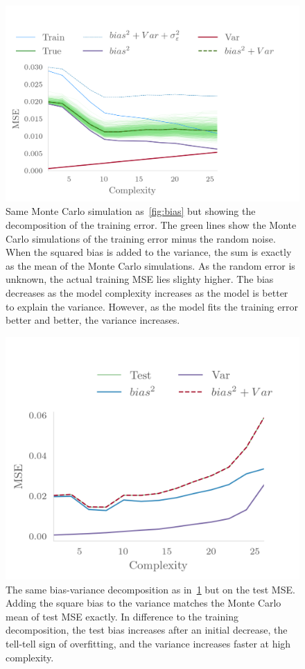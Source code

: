 \begin{figure}[]
  \centering
  \includegraphics[]{figures/trainbiasvariance.png}
  \caption{\label{fig:biastrain} Same Monte Carlo simulation as~\cref{fig:bias}
  but showing the decomposition of the training error. The green lines show the
  Monte Carlo simulations of the training error minus the random noise. When the
squared bias is added to the variance, the sum is exactly as the mean of the
Monte Carlo simulations. As the random error is unknown, the actual training MSE
lies slighty higher. The bias decreases as the model complexity increases as the
model is better to explain the variance. However, as the model fits the training
error better and better, the variance increases.}
\end{figure}


\begin{figure}[]
  \centering
  \includegraphics[]{figures/testbiasvariance.png}
  \caption{\label{fig:biastest} The same bias-variance decomposition as
    in~\cref{fig:biastrain} but on the test MSE. Adding the square bias to the
    variance matches the Monte Carlo mean of test MSE exactly. In difference to
    the training decomposition, the test bias increases after an initial
    decrease, the tell-tell sign of overfitting, and the variance increases
    faster at high complexity.}
\end{figure}
